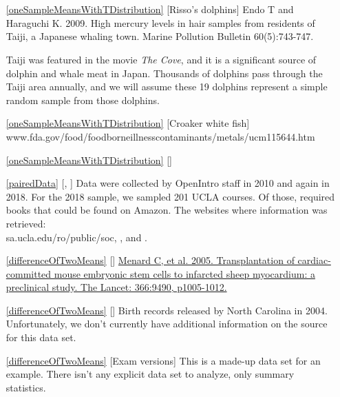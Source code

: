 





\section{}
\label{ch_inference_for_means_data}

\begin{itemize}
\item[\ref{oneSampleMeansWithTDistribution}]
    [Risso's dolphins]
    Endo T and Haraguchi K. 2009.
    High mercury levels in hair samples from residents of Taiji,
    a Japanese whaling town.
    Marine Pollution Bulletin 60(5):743-747.

    Taiji was featured in the movie
    \emph{The Cove}, and it is a significant source of dolphin
    and whale meat in Japan.
    Thousands of dolphins pass through the Taiji area annually,
    and we will assume these 19 dolphins represent a simple
    random sample from those dolphins.
\item[\ref{oneSampleMeansWithTDistribution}]
    [Croaker white fish]
        {www.fda.gov/food/foodborneillnesscontaminants/metals/ucm115644.htm}
\item[\ref{oneSampleMeansWithTDistribution}]
    [\datalink{run17}]

\item[\ref{pairedData}]
    [\datalink{textbooks}, \datalink{ucla\_textbooks\_f18}]
    Data were collected by OpenIntro staff in 2010 and again
    in 2018.
    For the 2018 sample, we sampled 201 UCLA courses.
    Of those, \uclabookN{} required books that could be
    found on Amazon.
    The websites where information was retrieved: \\
        {sa.ucla.edu/ro/public/soc},
    ,
    and .

\item[\ref{differenceOfTwoMeans}]
    [\datalink{stem\_cells}]
    \href{menard-stem-cells-2005}%
        {Menard C, et al. 2005.
            Transplantation of cardiac-committed mouse embryonic
            stem cells to infarcted sheep myocardium:
            a preclinical study.
            The Lancet: 366:9490, p1005-1012.}
\item[\ref{differenceOfTwoMeans}]
    [\datalink{ncbirths}]
    Birth records released by North Carolina in 2004.
    Unfortunately, we don't currently have additional
    information on the source for this data set.
\item[\ref{differenceOfTwoMeans}]
    [Exam versions]
    This is a made-up data set for an example.
    There isn't any explicit data set to analyze,
    only summary statistics.


\end{itemize}
